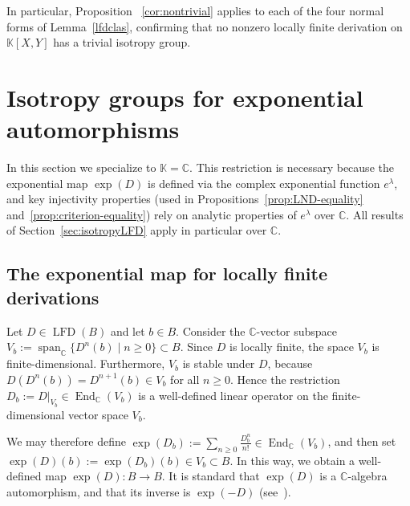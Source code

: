 \documentclass[11pt,a4paper,reqno]{amsart}
\begin{document}
In particular, Proposition ~\ref{cor:nontrivial} applies to each of the four normal forms of Lemma~\ref{lfdclas}, confirming that no nonzero locally finite derivation on $\mathbb{K}[X,Y]$ has a trivial isotropy group.


\section{Isotropy groups for exponential automorphisms}\label{sec:isotropyLFA}
 
In this section we specialize to $\mathbb{K}=\mathbb{C}$. This restriction is necessary because the exponential map $\exp(D)$ is defined via the complex exponential function $e^\lambda$, and key injectivity properties (used in Propositions~\ref{prop:LND-equality} and~\ref{prop:criterion-equality}) rely on analytic properties of $e^\lambda$ over $\mathbb{C}$. All results of Section~\ref{sec:isotropyLFD} apply in particular over $\mathbb{C}$.
 
\subsection{The exponential map for locally finite derivations}
 
Let $D\in \operatorname{LFD}(B)$ and let $b\in B$. Consider the $\mathbb{C}$-vector subspace
$V_b:=\operatorname{span}_{\mathbb{C}}\{D^n(b)\mid n\geq 0\}\subset B$.
Since $D$ is locally finite, the space $V_b$ is finite-dimensional. Furthermore, $V_b$ is stable under $D$, because $D(D^n(b))=D^{n+1}(b)\in V_b$ for all $n\geq 0$.
Hence the restriction $D_b:=D|_{V_b}\in \operatorname{End}_{\mathbb{C}}(V_b)$
is a well-defined linear operator on the finite-dimensional vector space $V_b$.
 
We may therefore define
$\exp(D_b):=\displaystyle\sum_{n\geq 0}\frac{D_b^n}{n!}\in \operatorname{End}_{\mathbb{C}}(V_b)$,
and then set $\exp(D)(b):=\exp(D_b)(b)\in V_b\subset B$.
In this way, we obtain a well-defined map $\exp(D)\colon B\to B$. It is standard that $\exp(D)$ is a $\mathbb{C}$-algebra automorphism, and that its inverse is $\exp(-D)$ (see~\cite{Maubach03}).
 
\end{document}
